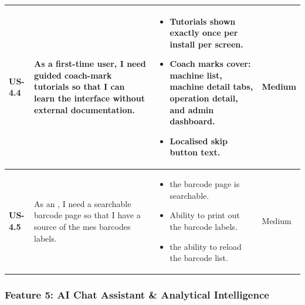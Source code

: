 \begin{longtable}{p{1.5cm} p{5cm} p{6.5cm} p{2cm}}
	\textbf{US-4.4} &
	As a first-time user, I need guided coach-mark tutorials so that I can learn
	the interface without external documentation.
	&
	\begin{itemize}[nosep, leftmargin=*]
	\item Tutorials shown exactly once per install per screen.
	\item Coach marks cover: machine list, machine detail tabs, operation
	detail, and admin dashboard.
	\item Localised skip button text.
	\end{itemize}
	& Medium \\
	\midrule
	\textbf{US-4.5} &
	As an \userrole{Administrator}, I need a searchable barcode page
	so that I have a source of the mes barcodes labels.
	&
	\begin{itemize}[nosep, leftmargin=*]
	\item the barcode page is searchable.
	\item Ability to print out the barcode labels.
	\item the ability to reload the barcode list.
	\end{itemize}
	& Medium \\
	\bottomrule
\end{longtable}


\subsubsection*{Feature 5: AI Chat Assistant \& Analytical Intelligence}
\label{domain5}

\vspace{0.3cm}

